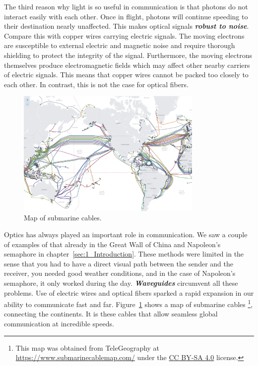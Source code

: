 The third reason why light is so useful in communication is that photons do not interact easily with each other.
Once in flight, photons will continue speeding to their destination nearly unaffected.
This makes optical signals \textit{\textbf{robust to noise}}.
Compare this with copper wires carrying electric signals.
The moving electrons are susceptible to external electric and magnetic noise and require thorough shielding to protect the integrity of the signal.
Furthermore, the moving electrons themselves produce electromagnetic fields which may affect other nearby carriers of electric signals.
This means that copper wires cannot be packed too closely to each other.
In contrast, this is not the case for optical fibers.

\begin{figure}[t]
    \centering
    \includegraphics[width=0.8\textwidth]{lesson5/5-1_underwater_cable_map.png}
    \caption[Underwater cabel map]{Map of submarine cables.}
    \label{fig:5-1_underwater_cable_map}
\end{figure}

Optics has always played an important role in communication.
We saw a couple of examples of that already in the Great Wall of China and Napoleon's semaphore in chapter~\ref{sec:1_Introduction}.
These methods were limited in the sense that you had to have a direct visual path between the sender and the receiver, you needed good weather conditions, and in the case of Napoleon's semaphore, it only worked during the day.
\textit{\textbf{Waveguides}} circumvent all these problems.
Use of electric wires and optical fibers sparked a rapid expansion in our ability to communicate fast and far.
Figure~\ref{fig:5-1_underwater_cable_map} shows a map of submarine cables \footnote{This map was obtained from TeleGeography at \href{https://www.submarinecablemap.com/}{https://www.submarinecablemap.com/} under the \href{https://creativecommons.org/licenses/by-sa/4.0/}{CC BY-SA 4.0} license.}, connecting the continents.
It is these cables that allow seamless global communication at incredible speeds.

